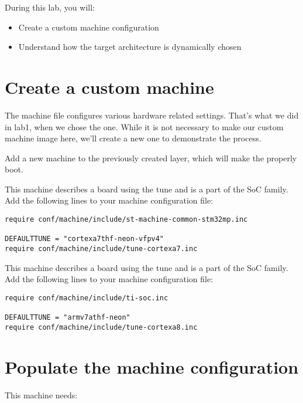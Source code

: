 
During this lab, you will:
\begin{itemize}
  \item Create a custom machine configuration
  \item Understand how the target architecture is dynamically chosen
\end{itemize}

\section{Create a custom machine}

The machine file configures various hardware related settings. That's
what we did in lab1, when we chose the 
{} {} one. While it
is not necessary to make our custom machine image here, we'll create a
new one to demonstrate the process.

Add a new  machine to the previously created layer, which
will make the
 properly
boot.

\if{}
This machine describes a board using the 
tune and is a part of the  SoC family. Add the following
lines to your machine configuration file:

\begin{verbatim}
require conf/machine/include/st-machine-common-stm32mp.inc

DEFAULTTUNE = "cortexa7thf-neon-vfpv4"
require conf/machine/include/tune-cortexa7.inc
\end{verbatim}
\else
This machine describes a board using the  tune
and is a part of the  SoC family. Add the following lines
to your machine configuration file:

\begin{verbatim}
require conf/machine/include/ti-soc.inc

DEFAULTTUNE = "armv7athf-neon"
require conf/machine/include/tune-cortexa8.inc
\end{verbatim}
\fi
\section{Populate the machine configuration}

This  machine needs:

